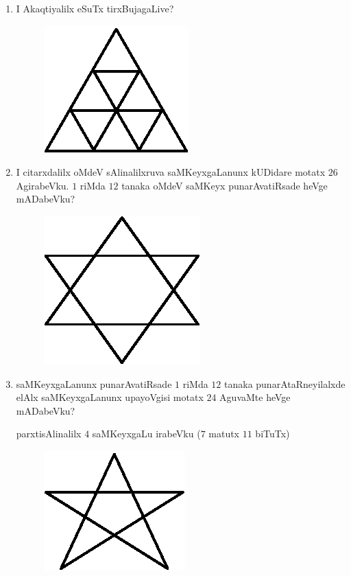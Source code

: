 \begin{enumerate}
\item I Akaqtiyalilx eSuTx tirxBujagaLive?
\begin{figure}[H]
\centering
\includegraphics[scale=0.9]{src/figures/exr22.eps}
\end{figure}

\item I citarxdalilx oMdeV sAlinalilxruva saMKeyxgaLanunx kUDidare motatx $26$ AgirabeVku. $1$ riMda $12$ tanaka oMdeV saMKeyx punarAvatiRsade heVge mADabeVku?
\begin{figure}[H]
\centering
\includegraphics[scale=0.9]{src/figures/exr23.eps}
\end{figure}

\eject

\item saMKeyxgaLanunx punarAvatiRsade $1$ riMda $12$ tanaka punarAtaRneyilalxde elAlx saMKeyxgaLanunx upayoVgisi motatx $24$ AguvaMte heVge mADabeVku?

parxtisAlinalilx $4$ saMKeyxgaLu irabeVku ($7$ matutx $11$ biTuTx)
\begin{figure}[H]
\centering
\includegraphics[scale=0.9]{src/figures/exr24.eps}
\end{figure}


\end{enumerate}
